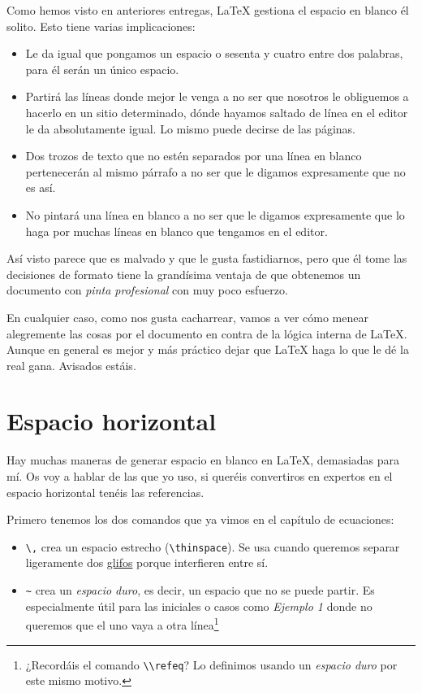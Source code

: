 Como hemos visto en anteriores entregas, LaTeX gestiona el espacio en
blanco él solito. Esto tiene varias implicaciones:

\begin{itemize}
\item
  Le da igual que pongamos un espacio o sesenta y cuatro entre dos
  palabras, para él serán un único espacio.
\item
  Partirá las líneas donde mejor le venga a no ser que nosotros le
  obliguemos a hacerlo en un sitio determinado, dónde hayamos saltado de
  línea en el editor le da absolutamente igual. Lo mismo puede decirse
  de las páginas.
\item
  Dos trozos de texto que no estén separados por una línea en blanco
  pertenecerán al mismo párrafo a no ser que le digamos expresamente que
  no es así.
\item
  No pintará una línea en blanco a no ser que le digamos expresamente
  que lo haga por muchas líneas en blanco que tengamos en el editor.
\end{itemize}

Así visto parece que es malvado y que le gusta fastidiarnos, pero que él
tome las decisiones de formato tiene la grandísima ventaja de que
obtenemos un documento con \emph{pinta profesional} con muy poco
esfuerzo.

En cualquier caso, como nos gusta cacharrear, vamos a ver cómo menear
alegremente las cosas por el documento en contra de la lógica interna de
LaTeX. Aunque en general es mejor y más práctico dejar que LaTeX haga lo
que le dé la real gana. Avisados estáis.

\section{Espacio horizontal}

Hay muchas maneras de generar espacio en blanco en LaTeX, demasiadas
para mí. Os voy a hablar de las que yo uso, si queréis convertiros en
expertos en el espacio horizontal tenéis las referencias.

Primero tenemos los dos comandos que ya vimos en el capítulo de
ecuaciones:

\begin{itemize}
\item
  \lstinline!\,! crea un espacio estrecho (\lstinline!\thinspace!). Se
  usa cuando queremos separar ligeramente dos
  \href{http://defharo.com/tipografia/glifos/}{glifos} porque
  interfieren entre sí.
\item
  \lstinline!~! crea un \emph{espacio duro}, es decir, un espacio que no
  se puede partir. Es especialmente útil para las iniciales o casos como
  \emph{Ejemplo 1} donde no queremos que el uno vaya a otra línea\footnote{¿Recordáis el comando \lstinline!\\refeq!? Lo definimos usando un
  \emph{espacio duro} por este mismo motivo.}
\end{itemize}


